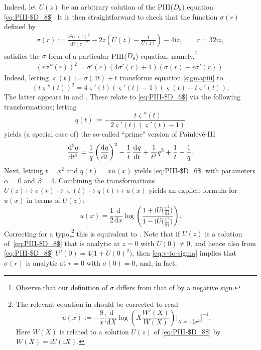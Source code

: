 \documentclass[pdftex]{sigma}
\numberwithin{equation}{section}
\newcommand{\dd}{\mathrm{d}}
\newcommand{\ii}{\mathrm{i}}
\newcommand\lb{\left(}
\newcommand\rb{\right)}
\begin{document}
 Indeed, let $U(z)$ be an arbitrary solution of the PIII($D_8$) equation \eqref{eq:PIII-$D_8$}. It is then straightforward to check that the function $\sigma(r)$ defined by
 	\begin{gather}
 	\sigma(r):=\frac{z^2U'(z)^2}{4U(z)^2}-
 2z\lb U(z)-\frac1{U(z)}\rb-4\ii z, \qquad r = 32\ii z, \label{eq:v-to-sigma}
 	\end{gather}
 satisfies the $\sigma$-form of a particular PIII($D_6$) equation, namely,\footnote{Observe that our definition of $\sigma$ differs from that of \cite{TWBessel} by a negative sign.}
 	\begin{gather}\label{sigmapiii}
 	\lb r\sigma''(r)\rb^2=\sigma'(r)(4\sigma'(r)+1)(\sigma(r)-r\sigma'(r)).
 	\end{gather}
 Indeed, letting
$%
 {\varsigma}(t) := \sigma(4t) + t
$
 transforms equation \eqref{sigmapiii} to
 \begin{equation*}
 (t\varsigma''(t) )^2 = 4\varsigma'(t)(\varsigma'(t) - 1)(\varsigma(t) - t \varsigma'(t)).
 \end{equation*}
 The latter appears in \cite[equation (3.13)]{Jimbo} and \cite[equation~($E_{\mathrm{III}'}$)]{Okamoto_1980}. These relate to \eqref{eq:PIII-$D_6$} via the following transformations; letting
 \[
 q(t):= -\dfrac{t \varsigma''(t)}{2\varsigma'(t)(\varsigma'(t)-1)}
 \]
 yields (a special case of) the so-called ``prime" version of Painlev\'e-III
 \[
 \dod[2]{q}{t} = \frac{1}{q} \left(\dod{q}{t}\right)^2 - \frac1t \dod{q}{t}+ \frac{1}{t^2}q^3 + \frac1t - \frac{1}{q}.
 \]
 Next, letting $t = x^2$ and $q(t) = xu(x)$ yields \eqref{eq:PIII-$D_6$} with parameters $\alpha = 0$ and $\beta = 4$. Combining the transformations $U(z)\mapsto\sigma(r)\mapsto\varsigma(t)\mapsto q(t)\mapsto u(x)$ yields an explicit formula for $u(x)$ in terms of $U(z)$:
 \[
 u(x)=\frac{1}{2}\frac{\dd}{\dd x}\log\left(\frac{1+\ii U\big(\frac{x^2}{8\ii}\big)}{1-\ii U\big(\frac{x^2}{8\ii}\big)}\right).
 \]
 Correcting for a typo,\footnote{The relevant equation in \cite{BLM20} should be corrected to read
 \[
 u(x):=-\frac{8}{x}\Bigg[\frac{\dd}{\dd X}\log\left(X\frac{W'(X)}{W(X)}\right)\bigg|_{X=-\frac{1}{8}x^2}\Bigg]^{-1}.
 \]
 Here $W(X)$ is related to a solution $U(z)$ of \eqref{eq:PIII-$D_8$} by $W(X)=\ii U(\ii X)$.} this is equivalent to \cite[equation~(112)]{BLM20}. Note that if $U(z)$ is a solution of~\eqref{eq:PIII-$D_8$} that is analytic at $z=0$ with $U(0)\neq 0$, and hence also from \eqref{eq:PIII-$D_8$} $U'(0)=4\big(1+U(0)^2\big)$, then \eqref{eq:v-to-sigma} implies that $\sigma(r)$ is analytic at $r=0$ with $\sigma(0)=0$, and, in fact,
\end{document}
